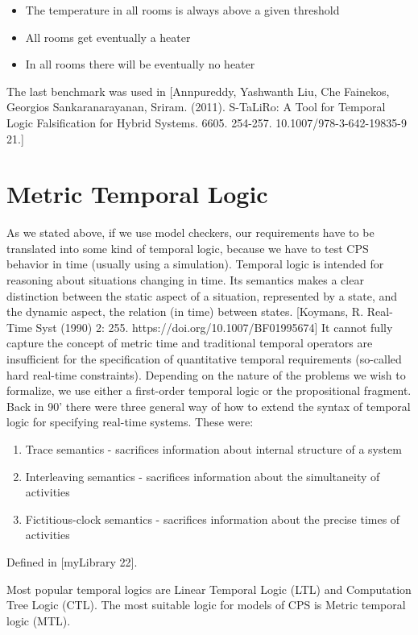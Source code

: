 \begin{itemize}
	\item The temperature in all rooms is always above a given threshold
	\item All rooms get eventually a heater
	\item In all rooms there will be eventually no heater
\end{itemize}

The last benchmark was used in [Annpureddy, Yashwanth Liu, Che  Fainekos, Georgios  Sankaranarayanan, Sriram. (2011). S-TaLiRo: A Tool for Temporal Logic Falsification for Hybrid Systems. 6605. 254-257. 10.1007/978-3-642-19835-9 21.]

\section{Metric Temporal Logic}

As we stated above, if we use model checkers, our requirements have to be translated into some kind of temporal logic, because we have to test CPS behavior in time (usually using a simulation). Temporal logic is intended for reasoning about situations changing in time. Its semantics makes a clear distinction between the static aspect of a situation, represented by a state, and the dynamic aspect, the relation (in time) between states. [Koymans, R. Real-Time Syst (1990) 2: 255. https://doi.org/10.1007/BF01995674] It cannot fully capture the concept of metric time and traditional temporal operators are insufficient for the specification of quantitative temporal requirements (so-called hard real-time constraints). Depending on the nature of the problems we wish to formalize, we use either a first-order temporal logic or the propositional fragment. Back in 90’ there were three general way of how to extend the syntax of temporal logic for specifying real-time systems. These were:

\begin{enumerate}
	\item Trace semantics - sacrifices information about internal structure of a system
	\item Interleaving semantics - sacrifices information about the simultaneity of activities
	\item Fictitious-clock semantics - sacrifices information about the precise times of activities
\end{enumerate}
Defined in [myLibrary 22].

Most popular temporal logics are Linear Temporal Logic (LTL) and Computation Tree Logic (CTL). The most suitable logic for models of CPS is Metric temporal logic (MTL).

